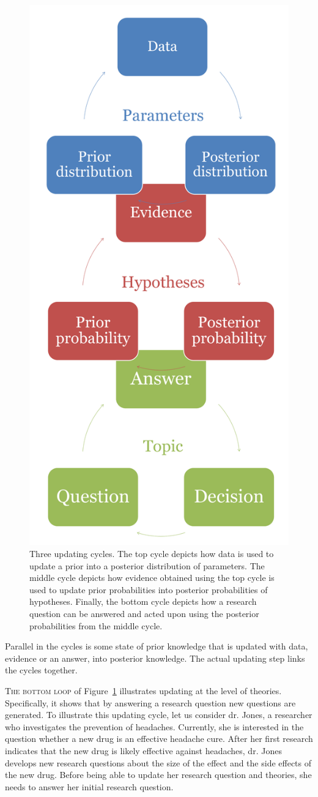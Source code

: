 \documentclass[man]{apa6}
\begin{document}
\begin{figure}
	\centering
	\includegraphics[width = .5\linewidth]{Figures/Figure1.pdf}
	\caption{Three updating cycles. The top cycle depicts how data is used to update a prior into a posterior distribution of parameters. The middle cycle depicts how evidence obtained using the top cycle is used to update prior probabilities into posterior probabilities of hypotheses. Finally, the bottom cycle depicts how a research question can be answered and acted upon using the posterior probabilities from the middle cycle.}
	\label{fig:loops}
\end{figure}
Parallel in the cycles is some state of prior knowledge that is updated with data, evidence or an answer, into posterior knowledge.
The actual updating step links the cycles together.

\textsc{The bottom loop} of Figure~\ref{fig:loops} illustrates updating at the level of theories.
Specifically, it shows that by answering a research question new questions are generated.
To illustrate this updating cycle, let us consider dr. Jones, a researcher who investigates the prevention of headaches.
Currently, she is interested in the question whether a new drug is an effective headache cure.
After her first research indicates that the new drug is likely effective against headaches, dr. Jones develops new research questions about the size of the effect and the side effects of the new drug.
Before being able to update her research question and theories, she needs to answer her initial research question.
\end{document}
